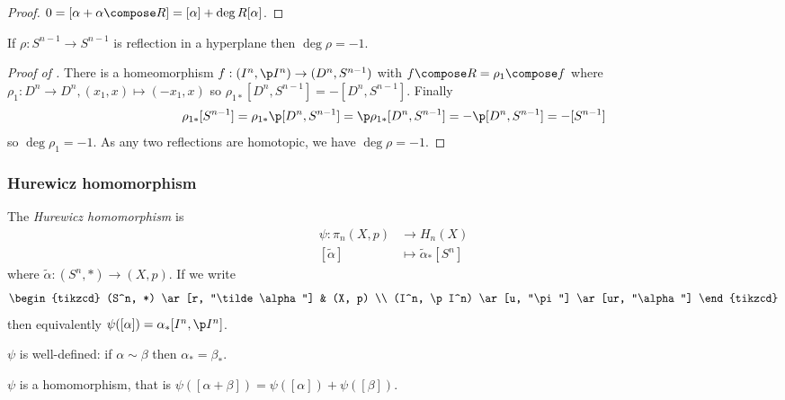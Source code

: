 \documentclass[a4paper]{article}
\renewcommand{\b}{\p}
\begin{document}
\begin{proof}
  \(0 = [\alpha + \alpha \compose R] = [\alpha] + \deg R [\alpha]\).
\end{proof}

\begin{proposition}
  If \(\rho: S^{n - 1} \to S^{n - 1}\) is reflection in a hyperplane then \(\deg \rho = -1\).
\end{proposition}

\begin{proof}[Proof of ]
  There is a homeomorphism \(f: (I^n, \b I^n) \to (D^n, S^{n - 1})\) with \(f \compose R = \rho_1 \compose f\) where \(\rho_1: D^n \to D^n, (x_1, x) \mapsto (-x_1, x)\) so \(\rho_{1*}[D^n, S^{n - 1}] = - [D^n, S^{n - 1}]\). Finally
  \[
    \rho_{1*}[S^{n - 1}] = \rho_{1*} \b [D^n, S^{n - 1}] = \b \rho_{1*} [D^n, S^{n - 1}] = - \b [D^n, S^{n - 1}] = -[S^{n - 1}]
  \]
  so \(\deg \rho_1 = -1\). As any two reflections are homotopic, we have \(\deg \rho = -1\).
\end{proof}

\subsubsection{Hurewicz homomorphism}

\begin{definition}
  The \emph{Hurewicz homomorphism} is
  \begin{align*}
    \psi: \pi_n(X, p) &\to H_n(X) \\
    [\tilde \alpha] &\mapsto \tilde \alpha_*[S^n]
  \end{align*}
  where \(\tilde \alpha: (S^n, *) \to (X, p)\). If we write
  \[
    \begin{tikzcd}
      (S^n, *) \ar[r, "\tilde \alpha"] & (X, p) \\
      (I^n, \b I^n) \ar[u, "\pi"] \ar[ur, "\alpha"]
    \end{tikzcd}
  \]
  then equivalently \(\psi([\alpha]) = \alpha_*[I^n, \b I^n]\).
\end{definition}

\(\psi\) is well-defined: if \(\alpha \sim \beta\) then \(\alpha_* = \beta_*\).

\begin{proposition}
  \label{prop:Hurewicz homomorphism}
  \(\psi\) is a homomorphism, that is  \(\psi([\alpha + \beta]) = \psi([\alpha]) + \psi([\beta])\).
\end{proposition}
\end{document}
